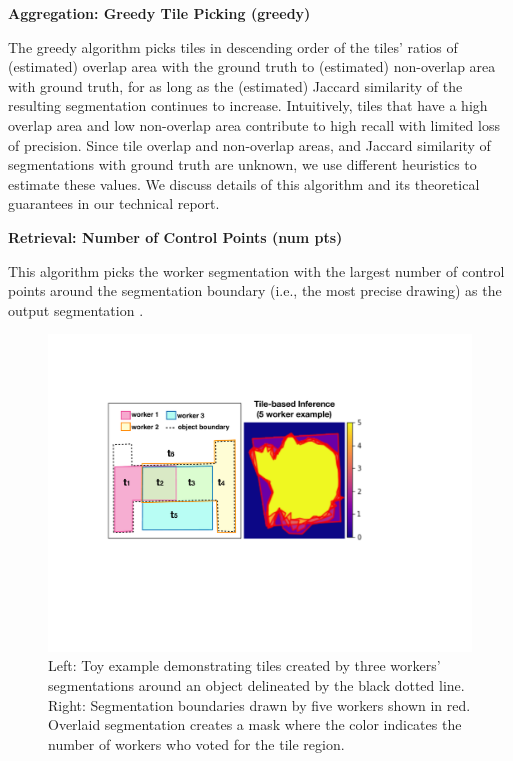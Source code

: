 \documentclass[letterpaper]{article}
\newcommand{\stitle}[1]{\noindent \textbf{#1}}
\begin{document}
\stitle{Aggregation: Greedy Tile Picking (greedy)} 
\par \noindent The greedy algorithm picks tiles in descending order of the tiles' ratios of (estimated) overlap area with the ground truth to (estimated) non-overlap area with ground truth, for as long as the (estimated) Jaccard similarity of the resulting segmentation continues to increase. Intuitively, tiles that have a high overlap area and low non-overlap area contribute to high recall with limited loss of precision.
Since tile overlap and non-overlap areas, and Jaccard similarity of segmentations with ground truth are unknown, we use different heuristics to estimate these values. We discuss details of this algorithm and its theoretical guarantees in our technical report. 

\stitle{Retrieval: Number of Control Points (num pts)}
\par \noindent This algorithm picks the worker segmentation with the largest number of control points around the segmentation boundary (i.e., the most precise drawing) as the output segmentation \cite{Vittayakorn2011,Sorokin2008}.

\begin{figure}[h!]
\centering
\includegraphics[width=0.8\linewidth]{plots/tile.pdf}
\caption{Left: Toy example demonstrating tiles created by three workers' segmentations around an object delineated by the black dotted line. Right: Segmentation boundaries drawn by five workers shown in red. Overlaid segmentation creates a mask where the color indicates the number of workers who voted for the tile region.}
\label{tile_demo}
\end{figure}  
\end{document}
